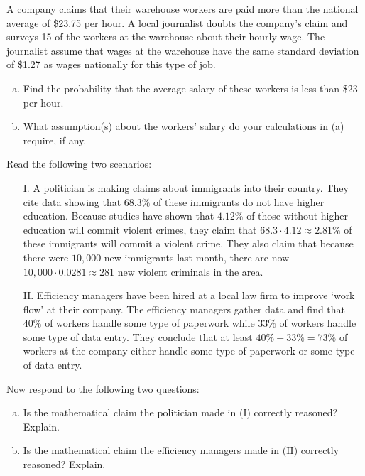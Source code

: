 \documentclass[12pt,letterpaper]{exam}
\begin{document}
\begin{questions}
\newpage
\question[10] A company claims that their warehouse workers are paid more than the national average of \$23.75 per hour. A local journalist doubts the company's claim and surveys 15 of the workers at the warehouse about their hourly wage. The journalist assume that wages at the warehouse have the same standard deviation of \$1.27 as wages nationally for this type of job.
	\begin{enumerate}[(a)]
	\item Find the probability that the average salary of these workers is less than \$23 per hour.
	\item What assumption(s) about the workers' salary do your calculations in (a) require, if any. 
	\end{enumerate}



\newpage
\question[10] Read the following two scenarios:
	\begin{enumerate}
	\item[I.] A politician is making claims about immigrants into their country. They cite data showing that $68.3\%$ of these immigrants do not have higher education. Because studies have shown that $4.12\%$ of those without higher education will commit violent crimes, they claim that $68.3 \cdot 4.12 \approx 2.81\%$ of these immigrants will commit a violent crime. They also claim that because there were $10,000$ new immigrants last month, there are now $10,\!000 \cdot 0.0281 \approx 281$ new violent criminals in the area.
	\item[II.] Efficiency managers have been hired at a local law firm to improve `work flow' at their company. The efficiency managers gather data and find that $40\%$ of workers handle some type of paperwork while $33\%$ of workers handle some type of data entry. They conclude that at least $40\% + 33\%= 73\%$ of workers at the company either handle some type of paperwork or some type of data entry. 
	\end{enumerate}
Now respond to the following two questions:

\begin{enumerate}[(a)]
\item Is the mathematical claim the politician made in (I) correctly reasoned? Explain.
\item Is the mathematical claim the efficiency managers made in (II) correctly reasoned? Explain.
\end{enumerate}




















\end{questions}
\end{document}
